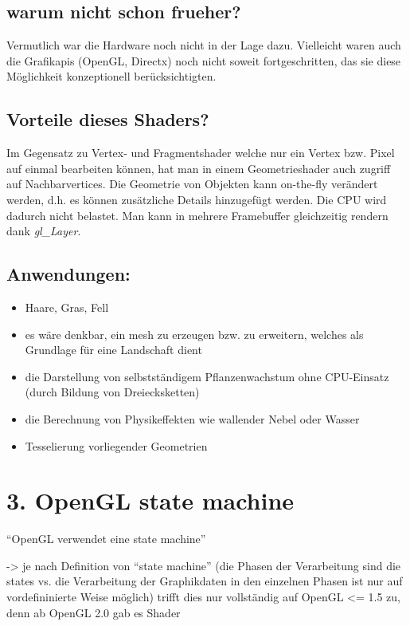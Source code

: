 \documentclass[12pt]{scrreprt}
\begin{document}
\subsection*{warum nicht schon frueher?}

Vermutlich war die Hardware noch nicht in der Lage dazu.
Vielleicht waren auch die Grafikapis (OpenGL, Directx) noch nicht
soweit fortgeschritten, das sie diese Möglichkeit konzeptionell
berücksichtigten.

\subsection*{Vorteile dieses Shaders?}

Im Gegensatz zu Vertex- und Fragmentshader welche nur ein Vertex bzw.
Pixel auf einmal bearbeiten können, hat man in einem Geometrieshader
auch zugriff auf Nachbarvertices.
Die Geometrie von Objekten kann on-the-fly verändert werden, d.h. es
können zusätzliche Details hinzugefügt werden. Die CPU wird dadurch
nicht belastet.
Man kann in mehrere Framebuffer gleichzeitig rendern dank \emph{gl\_Layer}.

\subsection*{Anwendungen:}

\begin{itemize}
  \item Haare, Gras, Fell
  \item es wäre denkbar, ein mesh zu erzeugen bzw. zu erweitern,
    welches als Grundlage für eine Landschaft dient
  \item die Darstellung von selbstständigem Pflanzenwachstum ohne
    CPU-Einsatz (durch Bildung von Dreiecksketten)
  \item die Berechnung von Physikeffekten wie wallender Nebel oder Wasser
  \item Tesselierung vorliegender Geometrien
\end{itemize}


\section*{3. OpenGL state machine}

``OpenGL verwendet eine state machine''

-> je nach Definition von ``state machine'' (die Phasen der
Verarbeitung sind die states vs. die Verarbeitung der Graphikdaten in
den einzelnen Phasen ist nur auf vordefininierte Weise möglich) trifft
dies nur vollständig auf OpenGL <= 1.5 zu, denn ab OpenGL
2.0 gab es Shader
\end{document}
